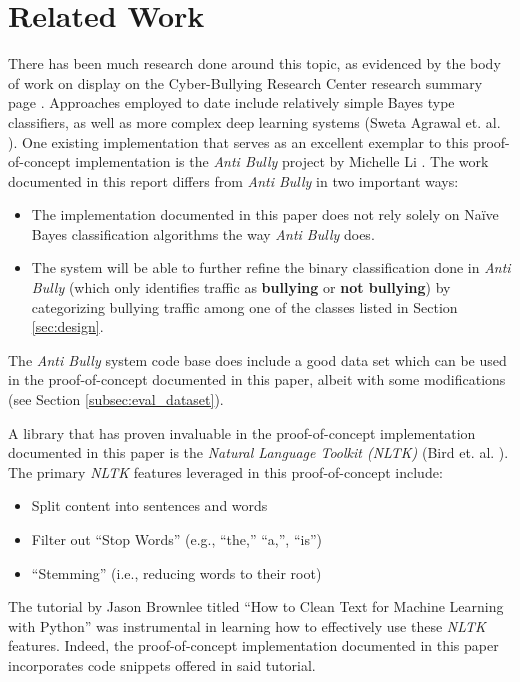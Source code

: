 \documentclass[conference]{sig-alternate-05-2015}
\begin{document}
\section{Related Work}\label{sec:related}

There has been much research done around this topic, as evidenced by the body of
work on display on the Cyber-Bullying Research Center research summary page
\cite{CBRC_research2018}. Approaches employed to date include relatively
simple Bayes type classifiers, as well as more complex deep learning systems
(Sweta Agrawal et. al. \cite{agrawal2018deep}). One existing implementation that
serves as an excellent exemplar to this proof-of-concept implementation is the
\textit{Anti Bully} project by Michelle Li \cite{Li2016}. The work documented
in this report differs from \textit{Anti Bully} in two important ways:

\begin{itemize}
  \item The implementation documented in this paper does not rely solely on
  Na\"{i}ve Bayes classification algorithms the way \textit{Anti Bully} does.
  \item The system will be able to further refine the binary
  classification done in \textit{Anti Bully} (which only identifies traffic as
  \textbf{bullying} or \textbf{not bullying}) by categorizing bullying traffic
  among one of the classes listed in Section \ref{sec:design}.
\end{itemize}

The \textit{Anti Bully} system code base does include a good data set which can
be used in the proof-of-concept documented in this paper, albeit with some
modifications (see Section \ref{subsec:eval_dataset}).

A library that has proven invaluable in the proof-of-concept implementation
documented in this paper is the \textit{Natural Language Toolkit (NLTK)}
(Bird et. al. \cite{bird2009natural}). The primary \textit{NLTK} features
leveraged in this proof-of-concept include:
\begin{itemize}
  \item Split content into sentences and words
  \item Filter out ``Stop Words'' (e.g., ``the,'' ``a,'', ``is'')
  \item ``Stemming'' (i.e., reducing words to their root)
\end{itemize}

The tutorial by Jason Brownlee titled ``How to Clean Text for Machine Learning
with Python'' \cite{brownlee-2017} was instrumental in learning how to
effectively use these \textit{NLTK} features. Indeed, the proof-of-concept
implementation documented in this paper incorporates code snippets offered in
said tutorial.
\end{document}

